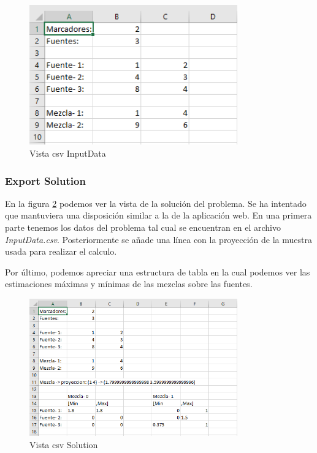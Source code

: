 \begin{figure}[h!] 
\centering
    \includegraphics[width=0.8\textwidth]{img/inputData.PNG}
\caption{Vista csv InputData}
\label{fig:inputData}
\end{figure}

\subsubsection{Export Solution}

En la figura \ref{fig:solution} podemos ver la vista de  la solución del problema. Se ha intentado que mantuviera una disposición similar a la de la aplicación web. En una primera parte tenemos los datos del problema tal cual se encuentran en el archivo \textit{InputData.csv}. Posteriormente se añade una línea con la proyección de la muestra usada para realizar el calculo.

Por último, podemos  apreciar una estructura de tabla en la cual podemos ver las estimaciones máximas y mínimas de las mezclas sobre las fuentes.

\begin{figure}[h!] 
\centering
    \includegraphics[width=0.8\textwidth]{img/solution.PNG}
\caption{Vista csv Solution}
\label{fig:solution}
\end{figure}

